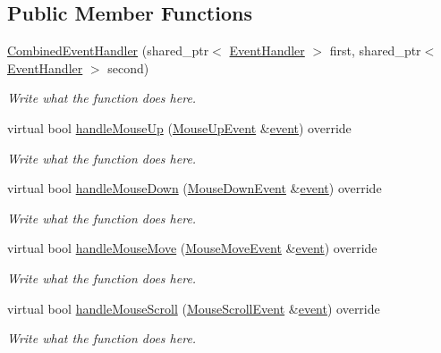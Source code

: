 \subsection*{Public Member Functions}
\begin{DoxyCompactItemize}
\item 
\hyperlink{classCombinedEventHandler_ad45f2a5d0eb584f62d94de4c3d589a80}{Combined\+Event\+Handler} (shared\+\_\+ptr$<$ \hyperlink{structEventHandler}{Event\+Handler} $>$ first, shared\+\_\+ptr$<$ \hyperlink{structEventHandler}{Event\+Handler} $>$ second)
\begin{DoxyCompactList}\small\item\em Write what the function does here. \end{DoxyCompactList}\item 
virtual bool \hyperlink{classCombinedEventHandler_a89f264f41a9de7162618e7549b24c82d}{handle\+Mouse\+Up} (\hyperlink{structMouseUpEvent}{Mouse\+Up\+Event} \&\hyperlink{unionSDL__Event}{event}) override
\begin{DoxyCompactList}\small\item\em Write what the function does here. \end{DoxyCompactList}\item 
virtual bool \hyperlink{classCombinedEventHandler_a7b4e923b77ac7c961d9919e4f169bf1a}{handle\+Mouse\+Down} (\hyperlink{structMouseDownEvent}{Mouse\+Down\+Event} \&\hyperlink{unionSDL__Event}{event}) override
\begin{DoxyCompactList}\small\item\em Write what the function does here. \end{DoxyCompactList}\item 
virtual bool \hyperlink{classCombinedEventHandler_ae7678e61d3ac2b416307bc5d4797fcdf}{handle\+Mouse\+Move} (\hyperlink{structMouseMoveEvent}{Mouse\+Move\+Event} \&\hyperlink{unionSDL__Event}{event}) override
\begin{DoxyCompactList}\small\item\em Write what the function does here. \end{DoxyCompactList}\item 
virtual bool \hyperlink{classCombinedEventHandler_a3f1d2344f2348a83242576eb9f9f81f6}{handle\+Mouse\+Scroll} (\hyperlink{structMouseScrollEvent}{Mouse\+Scroll\+Event} \&\hyperlink{unionSDL__Event}{event}) override
\begin{DoxyCompactList}\small\item\em Write what the function does here. \end{DoxyCompactList}\item 

\end{DoxyCompactItemize}
